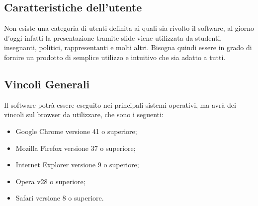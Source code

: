 \subsection{Caratteristiche dell'utente}
Non esiste una categoria di utenti definita ai quali sia rivolto il software, al giorno d'oggi infatti la presentazione tramite slide viene utilizzata da studenti, insegnanti, politici, rappresentanti e molti altri. Bisogna quindi essere in grado di fornire un prodotto di semplice utilizzo e intuitivo che sia adatto a tutti.

\subsection{Vincoli Generali}
Il software potrà essere eseguito nei principali sistemi operativi, ma avrà dei vincoli sul browser da utilizzare, che sono i seguenti:
\begin{itemize}
	\item Google Chrome versione 41 o superiore;
	\item Mozilla Firefox versione 37 o superiore;
	\item Internet Explorer versione 9 o superiore;
	\item Opera v28 o superiore;
	\item Safari versione 8 o superiore.
\end{itemize}
